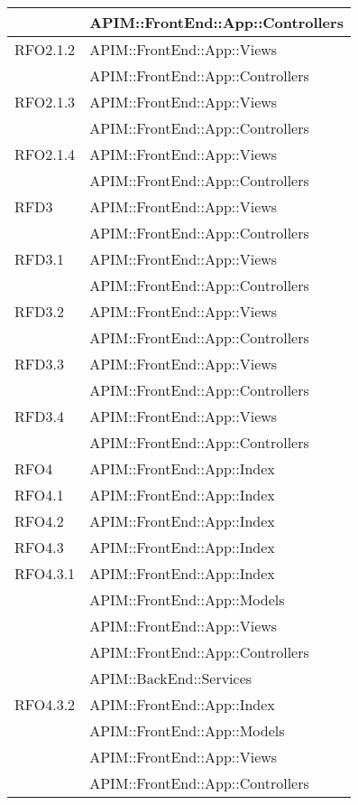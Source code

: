 \begin{longtable}{ p{4cm} | p{12cm} }
			& APIM::FrontEnd::App::Controllers \\
			\hline		
			RFO2.1.2
			& APIM::FrontEnd::App::Views \\
			& APIM::FrontEnd::App::Controllers \\
			\hline			
			RFO2.1.3
			& APIM::FrontEnd::App::Views \\
			& APIM::FrontEnd::App::Controllers \\
			\hline			
			RFO2.1.4
			& APIM::FrontEnd::App::Views \\
			& APIM::FrontEnd::App::Controllers \\
			\hline			
			RFD3
			& APIM::FrontEnd::App::Views \\
			& APIM::FrontEnd::App::Controllers \\
			\hline			
			RFD3.1
			& APIM::FrontEnd::App::Views \\
			& APIM::FrontEnd::App::Controllers \\
			\hline
			RFD3.2
			& APIM::FrontEnd::App::Views \\
			& APIM::FrontEnd::App::Controllers \\
			\hline
			RFD3.3
			& APIM::FrontEnd::App::Views \\
			& APIM::FrontEnd::App::Controllers \\
			\hline
			RFD3.4
			& APIM::FrontEnd::App::Views \\
			& APIM::FrontEnd::App::Controllers \\
			\hline
			RFO4
			& APIM::FrontEnd::App::Index \\
			\hline
			RFO4.1
			& APIM::FrontEnd::App::Index \\
			\hline
			RFO4.2
			& APIM::FrontEnd::App::Index \\
			\hline
			RFO4.3
			& APIM::FrontEnd::App::Index \\
			\hline
			RFO4.3.1
			& APIM::FrontEnd::App::Index \\
			& APIM::FrontEnd::App::Models \\
			& APIM::FrontEnd::App::Views \\
			& APIM::FrontEnd::App::Controllers \\
			& APIM::BackEnd::Services \\
			\hline
			RFO4.3.2
			& APIM::FrontEnd::App::Index \\
			& APIM::FrontEnd::App::Models \\
			& APIM::FrontEnd::App::Views \\
			& APIM::FrontEnd::App::Controllers \\

\end{longtable}
